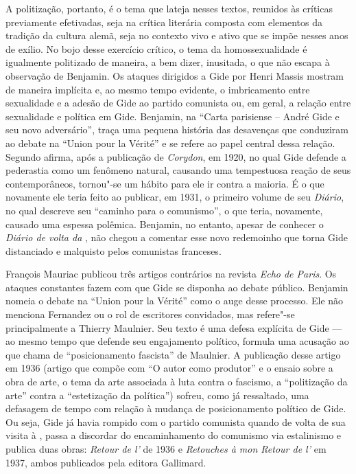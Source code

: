 A politização, portanto, é o tema que lateja nesses textos, reunidos às
críticas previamente efetivadas, seja na crítica literária composta com
elementos da tradição da cultura alemã, seja no contexto vivo e ativo
que se impõe nesses anos de exílio. No bojo desse exercício crítico, o
tema da homossexualidade é igualmente politizado de maneira, a bem
dizer, inusitada, o que não escapa à observação de Benjamin. Os ataques
dirigidos a Gide por Henri Massis mostram de maneira implícita e, ao
mesmo tempo evidente, o imbricamento entre sexualidade e a adesão de
Gide ao partido comunista ou, em geral, a relação entre sexualidade e
política em Gide. Benjamin, na ``Carta parisiense  -- André Gide e seu
novo adversário'', traça uma pequena história das desavenças que
conduziram ao debate na ``Union pour la Vérité'' e se refere ao papel
central dessa relação. Segundo afirma, após a publicação de
\emph{Corydon}, em 1920, no qual Gide defende a pederastia como um
fenômeno natural, causando uma tempestuosa reação de seus
contemporâneos, tornou"-se um hábito para ele ir contra a maioria. É o
que novamente ele teria feito ao publicar, em 1931, o primeiro volume de
seu \emph{Diário}, no qual descreve seu ``caminho para o comunismo'', o
que teria, novamente, causado uma espessa polêmica. Benjamin, no
entanto, apesar de conhecer o \emph{Diário de volta da }, não
chegou a comentar esse novo redemoinho que torna Gide distanciado e
malquisto pelos comunistas franceses.

François Mauriac publicou três artigos contrários na revista \emph{Echo de
Paris}. Os ataques constantes fazem com que Gide se disponha ao debate
público. Benjamin nomeia o debate na ``Union pour la Vérité'' como o
auge desse processo. Ele não menciona Fernandez ou o rol de escritores
convidados, mas refere"-se principalmente a Thierry Maulnier. Seu texto é
uma defesa explícita de Gide --- ao mesmo tempo que defende seu
engajamento político, formula uma acusação ao que chama de
``posicionamento fascista'' de Maulnier. A publicação desse artigo em
1936 (artigo que compõe com ``O autor como produtor'' e o ensaio sobre a
obra de arte, o tema da arte associada à luta contra o fascismo, a
``politização da arte'' contra a ``estetização da política'') sofreu,
como já ressaltado, uma defasagem de tempo com relação à mudança de
posicionamento político de Gide. Ou seja, Gide já havia rompido com o
partido comunista quando de volta de sua visita à , passa a
discordar do encaminhamento do comunismo via estalinismo e publica duas
obras: \emph{Retour de l'} de 1936 e \emph{Retouches à mon
Retour de l'} em 1937, ambos publicados pela editora Gallimard.

